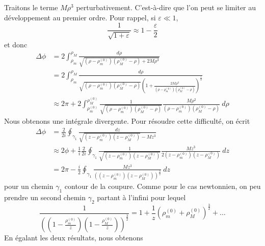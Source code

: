 \documentclass[a4paper,11pt]{report}
\begin{document}
            Traitons le terme $M\rho^3$ perturbativement. C'est-à-dire que l'on peut se limiter au développement au premier ordre. Pour rappel, si $\varepsilon\ll1$,
            \begin{equation}
                \frac{1}{\sqrt{1+\varepsilon}}\approx1-\frac{\varepsilon}{2}
            \end{equation}
            et donc
            \begin{align}
                \Delta\phi &= 2\int^{\rho_M}_{\rho_m}\frac{d\rho}{\sqrt{\left( \rho-\rho^{(0)}_m \right)\left( \rho^{(0)}_M-\rho \right)+2M\rho^3}}\\
                &= 2\int^{\rho_M}_{\rho_m}\frac{d\rho}{\sqrt{\left( \rho-\rho^{(0)}_m \right)\left( \rho^{(0)}_M-\rho \right)}\left( 1+\frac{2M\rho^3}{\left( \rho-\rho^{(0)}_m \right)\left( \rho^{(0)}_M-\rho \right)} \right)^{\frac{1}{2}}} \\
                &\approx 2\pi + 2\int^{\rho^{(0)}_M}_{\rho^{(0)}_m}\frac{1}{\sqrt{\left( \rho-\rho^{(0)}_m \right)\left( \rho^{(0)}_M-\rho \right)}}\frac{M\rho^2}{\left( \rho-\rho^{(0)}_m \right)\left( \rho^{(0)}_M-\rho \right)} ~d\rho
            \end{align}
            Nous obtenons une intégrale divergente. Pour résoudre cette difficulté, on écrit
            \begin{align}
                \Delta\phi &= \frac{2}{2i}\oint_{\gamma_1}\frac{dz}{\sqrt{\left( z-\rho^{(0)}_m \right)\left( z-\rho^{(0)}_M \right)}-Mz^3}\\
                &\approx 2\phi+\frac{1}{i}\frac{2}{2i}\oint_{\gamma_1}\frac{1}{\sqrt{\left( z-\rho^{(0)}_m \right)\left( z-\rho^{(0)}_M \right)}}\frac{Mz^3}{2\left( z-\rho^{(0)}_m \right)\left( z-\rho^{(0)}_M \right)}~dz\\
                &= 2\pi-\frac{i}{2}\oint_{\gamma_1}\frac{Mz^3}{\left(\left( z-\rho^{(0)}_m \right)\left( z-\rho^{(0)}_M \right)\right)^{\frac{3}{2}}}~dz
            \end{align}
            pour un chemin $\gamma_1$ contour de la coupure. Comme pour le cas newtonnien, on peu prendre un second chemin $\gamma_2$ partant à l'infini pour lequel
            \begin{equation}
                \frac{1}{\left(\left( 1-\frac{\rho^{(0)}_m}{z} \right)\left( 1-\frac{\rho^{(0)}_M}{z} \right)\right)^{\frac{3}{2}}} = 1+\frac{1}{z}(\rho^{(0)}_m+\rho^{(0)}_M)^{\frac{3}{2}}+\dots
            \end{equation}
            En égalant les deux résultats, nous obtenons
\end{document}
